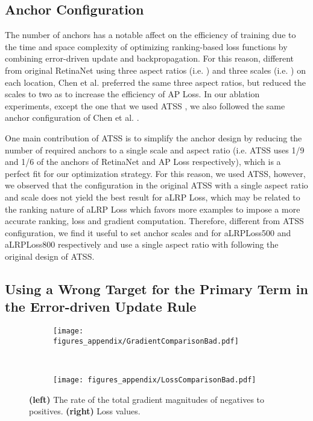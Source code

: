 \documentclass{article}
\begin{document}
\subsection{Anchor Configuration}
The number of anchors has a notable affect on the efficiency of training due to the time and space complexity of optimizing ranking-based loss functions by combining error-driven update and backpropagation. For this reason, different from original RetinaNet using three aspect ratios (i.e. ) and three scales (i.e. ) on each location, Chen et al. \cite{APLoss} preferred the same three aspect ratios, but reduced the scales to two as  to increase the efficiency of AP Loss. In our ablation experiments, except the one that we used ATSS \cite{ATSS}, we also followed the same anchor configuration of Chen et al. \cite{APLoss}.

One main contribution of ATSS is to simplify the anchor design by reducing the number of required anchors to a single scale and aspect ratio (i.e. ATSS uses 1/9 and 1/6 of the anchors of RetinaNet \cite{FocalLoss} and AP Loss \cite{APLoss} respectively), which is a perfect fit for our optimization strategy. For this reason, we used ATSS, however, we observed that the configuration in the original ATSS with a single aspect ratio and scale does not yield the best result for aLRP Loss, which may be related to the ranking nature of aLRP Loss which favors more examples to impose a more accurate ranking, loss and gradient computation. Therefore, different from ATSS configuration, we find it useful to set anchor scales  and  for aLRPLoss500 and aLRPLoss800 respectively and use a single aspect ratio with  following the original design of ATSS. 

\subsection{Using a Wrong Target for the Primary Term in the Error-driven Update Rule}
\begin{figure*}[t!]
    \begin{subfigure}[t]{0.5\textwidth}
        \centering
        \texttt{[image: figures\_appendix/GradientComparisonBad.pdf]}
    \end{subfigure}
    ~
    \begin{subfigure}[t]{0.47\textwidth}
        \centering
        \texttt{[image: figures\_appendix/LossComparisonBad.pdf]}
    \end{subfigure}    
    \caption{\textbf{(left)} The rate of the total gradient magnitudes of negatives to positives. \textbf{(right)} Loss values. \label{fig:GradComp2}}
\end{figure*}
\end{document}

